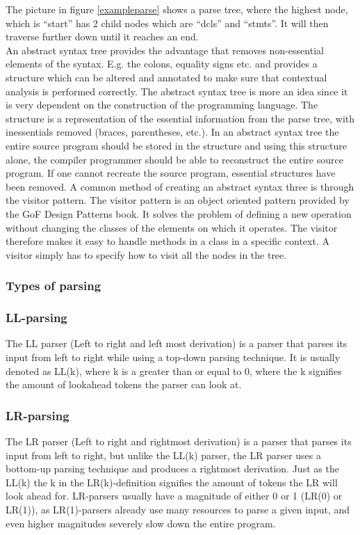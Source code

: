 The picture in figure \ref{exampleparse} shows a parse tree, where the highest node, which is “start” has 2 child nodes which are “dcls” and “stmts”. It will then traverse further down until it reaches an end.\\
An abstract syntax tree provides the advantage that removes non-essential elements of the syntax. E.g. the colons, equality signs etc. and provides a structure which can be altered and annotated to make sure that contextual analysis is performed correctly.
The abstract syntax tree is more an idea since it is very dependent on the construction of the programming language. The structure is a representation of the essential information from the parse tree, with inessentials removed (braces, parentheses, etc.). In an abstract syntax tree the entire source program should be stored in the structure and using this structure alone, the compiler programmer should be able to reconstruct the entire source program. If one cannot recreate the source program, essential structures have been removed.\cite{crafting-a-compiler}
A common method of creating an abstract syntax three is through the visitor pattern. The visitor pattern is an object oriented pattern provided by the GoF Design Patterns book.
It solves the problem of defining a new operation without changing the classes of the elements on which it operates.
The visitor therefore makes it easy to handle methods in a class in a specific context. A visitor simply has to specify how to visit all the nodes in the tree.
\subsubsection{Types of parsing}
\subsubsection*{LL-parsing}
The LL parser (Left to right and left most derivation) is a parser that parses its input from left to right while using a top-down parsing technique. It is usually denoted as LL(k), where k is a greater than or equal to 0, where the k signifies the amount of lookahead tokens the parser can look at\cite{conceptsOfProgrammingLanguages}.

\subsubsection*{LR-parsing}
The LR parser (Left to right and rightmost derivation) is a parser that parses its input from left to right, but unlike the LL(k) parser, the LR parser uses a bottom-up parsing technique and produces a rightmost derivation. Just as the LL(k) the k in the LR(k)-definition signifies the amount of tokens the LR will look ahead for\cite{conceptsOfProgrammingLanguages}. LR-parsers usually have a magnitude of either 0 or 1 (LR(0) or LR(1)), as LR(1)-parsers already use many resources to parse a given input, and even higher magnitudes severely slow down the entire program.

